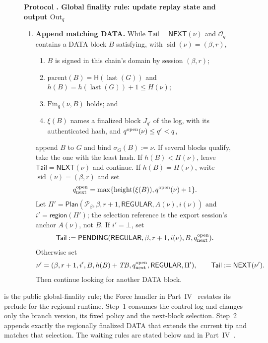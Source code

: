 \documentclass[11pt,a4paper]{article}
\newcommand{\Hash}{\mathsf H}
\newcommand{\TB}{\mathit{TB}}
\newcommand{\tagg}[1]{\ensuremath{\mathsf{#1}}}
\newcounter{protocol}
\newenvironment{protocol}[3][htbp]{\begin{figure}[#1]\refstepcounter{protocol}\label{#2}
\begin{mdframed}[linewidth=.6pt,skipabove=0pt,skipbelow=0pt,
innertopmargin=7pt,innerbottommargin=7pt]\small
\textbf{Protocol \theprotocol. #3}\par\smallskip}{\end{mdframed}\end{figure}}
\begin{document}
\begin{protocol}[H]{alg:global-rule}{Global finality rule: update replay state and output $\mathrm{Out}_q$}
\begin{enumerate}[label=\textbf{\arabic*)},itemsep=3pt]
\item \textbf{Append matching DATA.}
While $\mathsf{Tail}=\tagg{NEXT}(\nu)$ and $\mathcal O_q$ contains a
DATA block $B$ satisfying, with
$\operatorname{sid}(\nu)=(\beta,r)$,
  \begin{enumerate}[label=(\alph*),itemsep=1pt]
  \item $B$ is signed in this chain's domain by session $(\beta,r)$;
  \item $\mathrm{parent}(B)=\Hash(\operatorname{last}(G))$ and
  $h(B)=h(\operatorname{last}(G))+1\le H(\nu)$;
  \item $\mathrm{Fin}_q(\nu,B)$ holds; and
  \item $\xi(B)$ names a finalized block $J_{q'}$ of the log, with its
  authenticated hash, and $q^{\rm open}(\nu)\le q'<q$,
  \end{enumerate}
append $B$ to $G$ and bind $\sigma_G(B):=\nu$.  If several blocks
qualify, take the one with the least hash.  If $h(B)<H(\nu)$, leave
$\mathsf{Tail}=\tagg{NEXT}(\nu)$ and continue.  If $h(B)=H(\nu)$, write
$\operatorname{sid}(\nu)=(\beta,r)$ and set
\[
 q^{\rm open}_{\rm next}=
 \max\{\operatorname{height}(\xi(B)),q^{\rm open}(\nu)+1\}.
\]
Let $\Pi'=\tagg{Plan}(\mathcal P_\beta,\beta,r+1,\tagg{REGULAR},A(\nu),
i(\nu))$ and $i'=\tagg{region}(\Pi')$; the selection reference is the
export session's anchor $A(\nu)$, not $B$. If $i'=\bot$, set
\[
 \mathsf{Tail}:=\tagg{PENDING}
 (\tagg{REGULAR},\beta,r+1,i(\nu),B,q^{\rm open}_{\rm next}).
\]
Otherwise set
\[
 \nu'=(\beta,r+1,i',B,h(B)+\TB,
       q^{\rm open}_{\rm next},\tagg{REGULAR},\Pi'),
 \qquad \mathsf{Tail}:=\tagg{NEXT}(\nu').
\]
Then continue looking for another DATA block.
\end{enumerate}
\end{protocol}

 is the public global-finality rule;
the Force handler in Part~IV~\cite{part4} restates its prelude for the regional runtime. Step~1 consumes the control log and changes only the
branch version, its fixed policy and the next-block selection. Step~2
appends exactly the regionally finalized DATA that extends the current
tip and matches that selection. The waiting rules are stated below and
in Part~IV~\cite{part4}.
\end{document}
